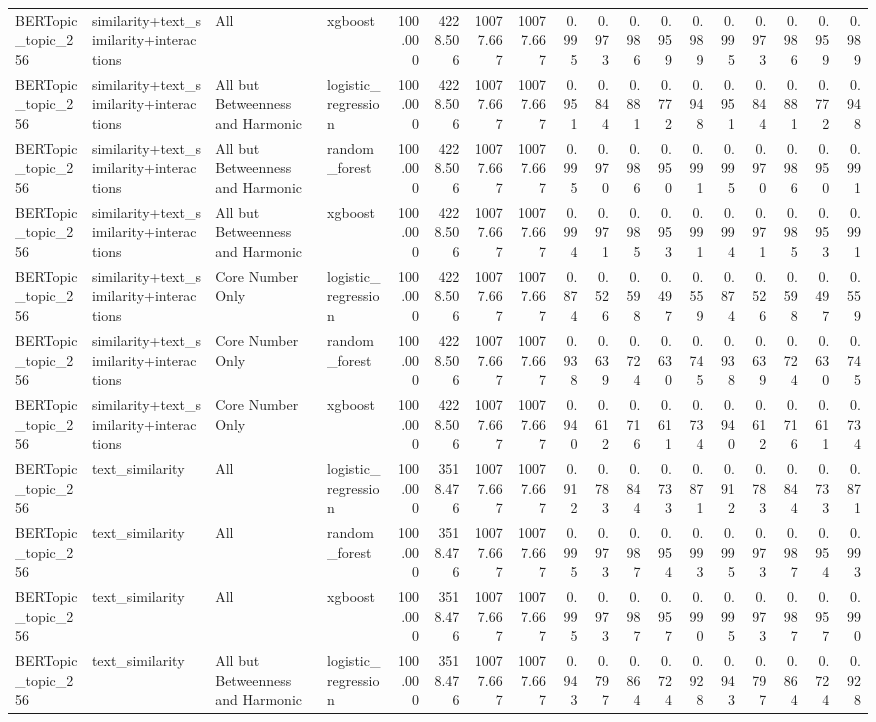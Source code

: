 \begin{tabular}{llllrrrrrrrrrrrrrr}
BERTopic_topic_256 & similarity+text_similarity+interactions & All & xgboost & 100.000 & 4228.506 & 10077.667 & 10077.667 & 0.995 & 0.973 & 0.986 & 0.959 & 0.989 & 0.995 & 0.973 & 0.986 & 0.959 & 0.989 \\
BERTopic_topic_256 & similarity+text_similarity+interactions & All but Betweenness and Harmonic & logistic_regression & 100.000 & 4228.506 & 10077.667 & 10077.667 & 0.951 & 0.844 & 0.881 & 0.772 & 0.948 & 0.951 & 0.844 & 0.881 & 0.772 & 0.948 \\
BERTopic_topic_256 & similarity+text_similarity+interactions & All but Betweenness and Harmonic & random_forest & 100.000 & 4228.506 & 10077.667 & 10077.667 & 0.995 & 0.970 & 0.986 & 0.950 & 0.991 & 0.995 & 0.970 & 0.986 & 0.950 & 0.991 \\
BERTopic_topic_256 & similarity+text_similarity+interactions & All but Betweenness and Harmonic & xgboost & 100.000 & 4228.506 & 10077.667 & 10077.667 & 0.994 & 0.971 & 0.985 & 0.953 & 0.991 & 0.994 & 0.971 & 0.985 & 0.953 & 0.991 \\
BERTopic_topic_256 & similarity+text_similarity+interactions & Core Number Only & logistic_regression & 100.000 & 4228.506 & 10077.667 & 10077.667 & 0.874 & 0.526 & 0.598 & 0.497 & 0.559 & 0.874 & 0.526 & 0.598 & 0.497 & 0.559 \\
BERTopic_topic_256 & similarity+text_similarity+interactions & Core Number Only & random_forest & 100.000 & 4228.506 & 10077.667 & 10077.667 & 0.938 & 0.639 & 0.724 & 0.630 & 0.745 & 0.938 & 0.639 & 0.724 & 0.630 & 0.745 \\
BERTopic_topic_256 & similarity+text_similarity+interactions & Core Number Only & xgboost & 100.000 & 4228.506 & 10077.667 & 10077.667 & 0.940 & 0.612 & 0.716 & 0.611 & 0.734 & 0.940 & 0.612 & 0.716 & 0.611 & 0.734 \\
BERTopic_topic_256 & text_similarity & All & logistic_regression & 100.000 & 3518.476 & 10077.667 & 10077.667 & 0.912 & 0.783 & 0.844 & 0.733 & 0.871 & 0.912 & 0.783 & 0.844 & 0.733 & 0.871 \\
BERTopic_topic_256 & text_similarity & All & random_forest & 100.000 & 3518.476 & 10077.667 & 10077.667 & 0.995 & 0.973 & 0.987 & 0.954 & 0.993 & 0.995 & 0.973 & 0.987 & 0.954 & 0.993 \\
BERTopic_topic_256 & text_similarity & All & xgboost & 100.000 & 3518.476 & 10077.667 & 10077.667 & 0.995 & 0.973 & 0.987 & 0.957 & 0.990 & 0.995 & 0.973 & 0.987 & 0.957 & 0.990 \\
BERTopic_topic_256 & text_similarity & All but Betweenness and Harmonic & logistic_regression & 100.000 & 3518.476 & 10077.667 & 10077.667 & 0.943 & 0.797 & 0.864 & 0.724 & 0.928 & 0.943 & 0.797 & 0.864 & 0.724 & 0.928 \\

\end{tabular}
